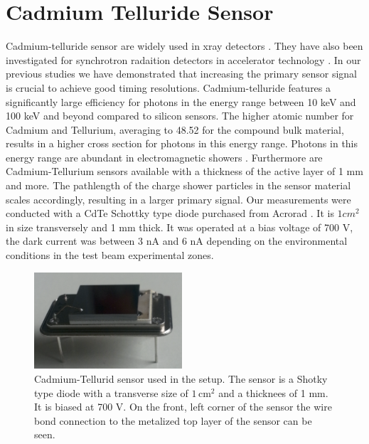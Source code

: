 %
%
%
\section{Cadmium Telluride Sensor}
\label{sec:siliconpad}

Cadmium-telluride sensor are widely used in xray detectors \cite{cdtesensorsgeneric}. They have also been investigated for synchrotron radaition detectors in accelerator technology \cite{cdtelhc}.   
In our previous studies \cite{Anderson:2015gha,Ronzhin:2015pba,MCPShowerMaxPaper,Ronzhin2015288,Ronzhin201552,SiliconTiming} we have demonstrated that increasing the primary sensor signal is crucial to achieve good timing resolutions.  
Cadmium-telluride features a significantly large efficiency for photons in the energy range between 10 keV and 100 keV and beyond compared to silicon sensors. The higher atomic number for Cadmium and Tellurium, averaging to 48.52 for the compound bulk material, results in a higher cross section for photons in this energy range. 
Photons in this energy range are abundant in electromagnetic showers \cite{showercomposition}. 
Furthermore are Cadmium-Tellurium sensors available with a thickness of the active layer of 1 mm and more. The pathlength of the charge shower particles in the sensor material scales accordingly, resulting in a larger primary signal.   
%
Our measurements were conducted with a CdTe Schottky type diode purchased from Acrorad \cite{acrorad}. It is $1 cm^2$ in size transversely and 1 mm thick.
It was operated at a bias voltage of 700 V, the dark current was between 3 nA and 6 nA depending on the environmental conditions in the test beam experimental zones.     
%
\begin{figure}[htbp] 
\centering
\includegraphics[width=0.49\textwidth]{figures/CdTeSensor.png} 
\caption{Cadmium-Tellurid sensor used in the setup. The sensor is a Shotky type diode with a transverse size of $\mathrm{1\, cm^2}$ and a thicknees of 1 mm. It is biased at 700 V. On the front, left corner of the sensor the wire bond connection to the metalized top layer of the sensor can be seen.} 
\label{fig:CdTeSensor} 
\end{figure} 
